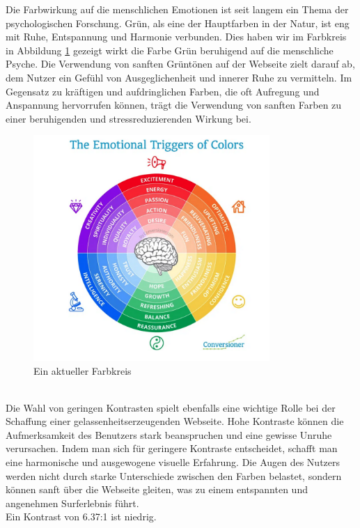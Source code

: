 \documentclass[./dokumentation.tex]{subfiles}
\begin{document}
Die Farbwirkung auf die menschlichen Emotionen ist seit langem ein Thema der psychologischen Forschung. Grün, als eine der Hauptfarben in der Natur, ist eng mit Ruhe, Entspannung und Harmonie verbunden. Dies haben wir im Farbkreis in Abbildung \ref{fig20:farbkreis} gezeigt wirkt die Farbe Grün beruhigend auf die menschliche Psyche. Die Verwendung von sanften Grüntönen auf der Webseite zielt darauf ab, dem Nutzer ein Gefühl von Ausgeglichenheit und innerer Ruhe zu vermitteln. Im Gegensatz zu kräftigen und aufdringlichen Farben, die oft Aufregung und Anspannung hervorrufen können, trägt die Verwendung von sanften Farben zu einer beruhigenden und stressreduzierenden Wirkung bei.\\

\begin{figure}[h]
\centering
\includegraphics[width=0.8\textwidth]{bilder/farbkreis.png}
\caption{Ein aktueller Farbkreis \cite{DesignEmo2003}}
\label{fig20:farbkreis}
\end{figure}\\

Die Wahl von geringen Kontrasten spielt ebenfalls eine wichtige Rolle bei der Schaffung einer gelassenheitserzeugenden Webseite. Hohe Kontraste können die Aufmerksamkeit des Benutzers stark beanspruchen und eine gewisse Unruhe verursachen. Indem man sich für geringere Kontraste entscheidet, schafft man eine harmonische und ausgewogene visuelle Erfahrung. Die Augen des Nutzers werden nicht durch starke Unterschiede zwischen den Farben belastet, sondern können sanft über die Webseite gleiten, was zu einem entspannten und angenehmen Surferlebnis führt.\\
Ein Kontrast von 6.37:1 ist niedrig. \\
\end{document}

